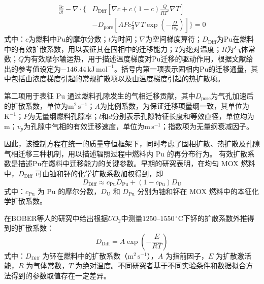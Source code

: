 \begin{equation}
	\begin{aligned}
		\frac{\partial c}{\partial t}
		-\nabla\cdot\Biggl\{
		&D_{\mathrm{Diff}}\left[\nabla c+c(1-c)\frac{Q}{RT^{2}}\nabla T\right]\\
		&-D_{\mathrm{pore}}\left[APc\frac{l}{d}\nabla T
		\exp\left(-\frac{D}{lv_p}\right)\right]
		\Biggr\}=0
	\end{aligned}
\end{equation}
式中：$c$为燃料中Pu的摩尔分数；$t$为时间；$\nabla$为空间梯度算符；$D_{\mathrm{Diff}}$为Pu在燃料中的有效扩散系数，用以表征其在固相中的迁移能力；$T$为绝对温度；$R$为气体常数；$Q$为有效摩尔输运热，用于描述温度梯度对Pu迁移的驱动作用，根据文献\cite{ishiiInvestigationPuMigration2001,clementPlutoniumRedistributionMixed1978}给出的参考值设定为$-146.44\,\mathrm{kJ\,mol^{-1}}$。括号内第一项表示固相内Pu的迁移通量，其中包括由浓度梯度引起的常规扩散项以及由温度梯度引起的热扩散项。

第二项用于表征 Pu 通过燃料孔隙发生的气相迁移贡献，其中$D_{\mathrm{pore}}$为气孔加速后的扩散系数，单位为$\mathrm{m^2\,s^{-1}}$；$A$为比例系数，为保证迁移项量纲一致，其单位为$\mathrm{K^{-1}}$；$P$为无量纲燃料孔隙率；$l$和$d$分别表示孔隙特征长度和等效直径，单位均为$\mathrm{m}$；$v_p$为孔隙中气相的有效迁移速度，单位为$\mathrm{m\,s^{-1}}$；指数项为无量纲衰减因子。

因此，该控制方程在统一的质量守恒框架下，同时考虑了固相扩散、热扩散及孔隙气相迁移三种机制，用以描述辐照过程中燃料内 Pu 的再分布行为。
有效扩散系数是描述Pu在燃料中迁移能力的关键参数。早期的研究表明\cite{boberPlutoniumRedistributionFast1973}，在均匀 MOX 燃料中，$D_{\mathrm{Diff}}$ 可由铀和钚的化学扩散系数加权得到，即
\begin{equation}
	D_{\mathrm{Diff}} \approx c_{\mathrm{Pu}} D_{\mathrm{Pu}} + (1 - c_{\mathrm{Pu}}) D_{\mathrm{U}}
\end{equation}
式中：$c_{\mathrm{Pu}}$ 为 Pu 的摩尔分数，$D_{\mathrm{U}}$ 和 $D_{\mathrm{Pu}}$ 分别为铀和钚在 MOX 燃料中的本征化学扩散系数。

在BOBER等人\cite{clementPlutoniumRedistributionMixed1978,boberPlutoniumRedistributionFast1973}的研究中给出根据$UO_2$中测量$1250$--$1550\,{}^\circ\mathrm{C}$下钚的扩散系数外推得到的扩散系数：
\begin{equation}
	D_{\mathrm{Diff}} = A\exp\!\left(-\frac{E}{RT}\right)
\end{equation}
式中：$D_{\mathrm{Diff}}$ 为钚在燃料中的扩散系数（$\mathrm{m^2\,s^{-1}}$），$A$ 为指前因子，$E$ 为扩散激活能，$R$ 为气体常数，$T$ 为绝对温度。不同研究者基于不同实验条件和数据拟合方法得到的参数取值存在一定差异。

